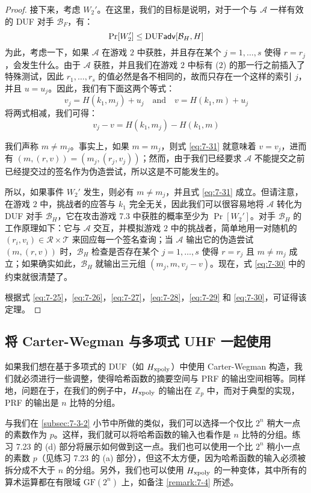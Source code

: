 \begin{proof}
接下来，考虑 $W_2'$。在这里，我们的目标是说明，对于一个与 $\mathcal{A}$ 一样有效的 DUF 对手 $\mathcal{B}_F$，有：
\begin{equation}\label{eq:7-30}
\Pr[W_2']\leq{\rm DUF}\mathsf{adv}[\mathcal{B}_H,H]
\end{equation}
为此，考虑一下，如果 $\mathcal{A}$ 在游戏 $2$ 中获胜，并且存在某个 $j=1,\dots,s$ 使得 $r=r_j$，会发生什么。由于 $\mathcal{A}$ 获胜，并且我们在游戏 $2$ 中标有 ($2$) 的那一行之前插入了特殊测试，因此 $r_1,\dots,r_s$ 的值必然是各不相同的，故而只存在一个这样的索引 $j$，并且 $u=u_j$。因此，我们有下面这两个等式：
\[
v_j=H(k_1,m_j)+u_j
\quad\text{and}\quad
v=H(k_1,m)+u_j
\]
将两式相减，我们可得：
\begin{equation}\label{eq:7-31}
v_j-v=H(k_1,m_j)-H(k_1,m)
\end{equation}

我们声称 $m\neq m_j$。事实上，如果 $m=m_j$，则式 \ref{eq:7-31} 就意味着 $v=v_j$，进而有 $(m,(r,v))=(m_j,(r_j,v_j))$；然而，由于我们已经要求 $\mathcal{A}$ 不能提交之前已经提交过的签名作为伪造尝试，所以这是不可能发生的。

所以，如果事件 $W_2'$ 发生，则必有 $m\neq m_j$，并且式 \ref{eq:7-31} 成立。但请注意，在游戏 $2$ 中，挑战者的应答与 $k_1$ 完全无关，因此我们可以很容易地将 $\mathcal{A}$ 转化为 DUF 对手 $\mathcal{B}_H$，它在攻击游戏 7.3 中获胜的概率至少为 $\Pr[W_2']$。对手 $\mathcal{B}_H$ 的工作原理如下：它与 $\mathcal{A}$ 交互，并模拟游戏 $2$ 中的挑战者，简单地用一对随机的 $(r_i,v_i)\in\mathcal{R}\times\mathcal{T}$ 来回应每一个签名查询；当 $\mathcal{A}$ 输出它的伪造尝试 $(m,(r,v))$ 时，$\mathcal{B}_H$ 检查是否存在某个 $j=1,\dots,s$ 使得 $r=r_j$ 且 $m\neq m_j$ 成立；如果确实如此，$\mathcal{B}_H$ 就输出三元组 $(m_j,m,v_j-v)$。现在，式 \ref{eq:7-30} 中的约束就很清楚了。

根据式 \ref{eq:7-25}，\ref{eq:7-26}，\ref{eq:7-27}，\ref{eq:7-28}，\ref{eq:7-29} 和 \ref{eq:7-30}，可证得该定理。
\end{proof}

\subsection{将 Carter-Wegman 与多项式 UHF 一起使用}\label{subsec:7-4-1}

如果我们想在基于多项式的 DUF（如 $H_{\rm xpoly}$）中使用 Carter-Wegman 构造，我们就必须进行一些调整，使得哈希函数的摘要空间与 PRF 的输出空间相等。同样地，问题在于，在我们的例子中，$H_{\rm xpoly}$ 的输出在 $\mathbb{Z}_p$ 中，而对于典型的实现，PRF 的输出是 $n$ 比特的分组。

与我们在 \ref{subsec:7-3-2} 小节中所做的类似，我们可以选择一个仅比 $2^n$ 稍大一点的素数作为 $p$。这样，我们就可以将哈希函数的输入也看作是 $n$ 比特的分组。练习 7.23 的 (d) 部分将展示如何做到这一点。我们也可以使用一个比 $2^n$ 稍小一点的素数 $p$（见练习 7.23 的 (a) 部分），但这不太方便，因为哈希函数的输入必须被拆分成不大于 $n$ 的分组。另外，我们也可以使用 $H_{\rm xpoly}$ 的一种变体，其中所有的算术运算都在有限域 $\mathrm{GF}(2^n)$ 上，如备注 \ref{remark:7-4} 所述。
